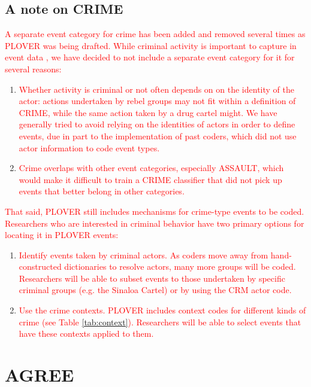 \documentclass[11pt]{report}
\newcommand{\andy}[1]{\textcolor{red}{#1}}
\begin{document}
\subsection{A note on CRIME}

\andy{A separate event category for crime has been added and removed several times as PLOVER was being drafted. While criminal activity is important to capture in event data \citep{osorio2015contagion, osorio2017supervised}, we have decided to not include a separate event category for it for several reasons:}

\begin{enumerate}

	\item \andy{Whether activity is criminal or not often depends on on the identity of the actor: actions undertaken by rebel groups may not fit within a definition of CRIME, while the same action taken by a drug cartel might. We have generally tried to avoid relying on the identities of actors in order to define events, due in part to the implementation of past coders, which did not use actor information to code event types. }
	\item \andy{Crime overlaps with other event categories, especially ASSAULT, which would make it difficult to train a CRIME classifier that did not pick up events that better belong in other categories.}
\end{enumerate}


\andy{That said, PLOVER still includes mechanisms for crime-type events to be coded. Researchers who are interested in criminal behavior have two primary options for locating it in PLOVER events:}

\begin{enumerate}
	\item \andy{Identify events taken by criminal actors. As coders move away from hand-constructed dictionaries to resolve actors, many more groups will be coded. Researchers will be able to subset events to those undertaken by specific criminal groups (e.g. the Sinaloa Cartel) or by using the CRM actor code.}
	\item \andy{Use the crime contexts. PLOVER includes context codes for different kinds of crime (see Table \ref{tab:context}). Researchers will be able to select events that have these contexts applied to them.}
\end{enumerate}



\section{AGREE}
\end{document}
